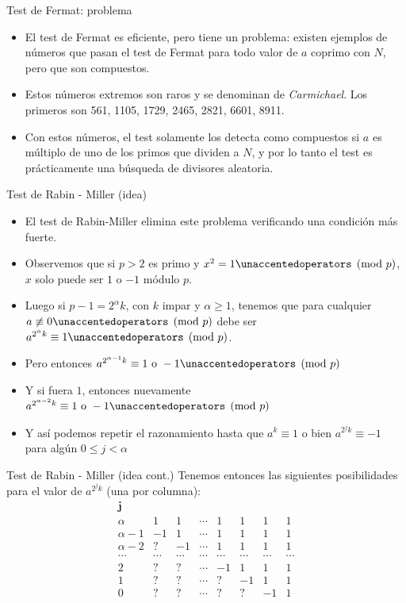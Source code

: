 \documentclass{beamer}
\begin{document}
\begin{frame}{Test de Fermat: problema}
  \begin{itemize}
      \item El test de Fermat es eficiente, pero tiene un problema: existen ejemplos de números que pasan el test de Fermat para todo valor de $a$ coprimo con $N$, pero que son compuestos.
      \item Estos números extremos son raros y se denominan de \textit{Carmichael}. Los primeros son 561, 1105, 1729, 2465, 2821, 6601, 8911.
      \item Con estos números, el test solamente los detecta como compuestos si $a$ es múltiplo de uno de los primos que dividen a $N$, y por lo tanto el test es prácticamente una búsqueda de divisores aleatoria.
  \end{itemize}
\end{frame}

\begin{frame}{Test de Rabin - Miller (idea)}
  \begin{itemize}
      \item El test de Rabin-Miller elimina este problema verificando una condición más fuerte.
      \item Observemos que si $p > 2$ es primo y $x^2 = 1 \modulo{p}$, $x$ solo puede ser $1$ o $-1$ módulo $p$.
      \item Luego si $p-1 = 2^\alpha k$, con $k$ impar y $\alpha \geq 1$, tenemos que para cualquier $a \not \equiv 0 \modulo{p}$ debe ser $a^{2^\alpha k} \equiv 1 \modulo{p}$.
      \item Pero entonces $a^{2^{\alpha-1} k} \equiv 1 \mbox{ o } -1 \modulo{p}$
      \item Y si fuera $1$, entonces nuevamente $a^{2^{\alpha-2} k} \equiv 1 \mbox{ o } -1 \modulo{p}$
      \item Y así podemos repetir el razonamiento hasta que $a^{k} \equiv 1$ o bien $a^{2^j k} \equiv -1$ para algún $0 \leq j < \alpha$
  \end{itemize}
\end{frame}

\begin{frame}{Test de Rabin - Miller (idea cont.)}
  Tenemos entonces las siguientes posibilidades para el valor de $a^{2^jk}$ (una por columna):
  $$\begin{array}{rccccccc}
      \mathbf{j} & \  & \ & \   & \ & \ & \  \\
      \alpha & 1 & 1 & \cdots & 1 & 1 & 1 & 1  \\
      \alpha-1 & -1 & 1 & \cdots & 1 & 1 & 1 & 1     \\
      \alpha-2 & ? & -1 & \cdots & 1 & 1 & 1 & 1    \\
      \cdots & \cdots & \cdots & \cdots & \cdots  & \cdots & \cdots &  \cdots    \\
      2 & ? & ? & \cdots & -1 &  1 & 1  & 1\\
      1 & ? & ? & \cdots &  ? & -1 & 1  & 1 \\
      0 & ? & ? & \cdots &  ? &  ? & -1 & 1 \\
    \end{array}
  $$
\end{frame}
\end{document}
